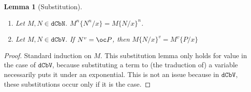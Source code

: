 \documentclass[10pt,a4paper]{article}
\newtheorem{lemma}[theorem]{Lemma}
\newcommand{\<}{\langle}
\renewcommand{\>}{\rangle}
\newcommand{\dcbn}{\ensuremath{\mathtt{dCbN}}}
\newcommand{\dcbv}{\ensuremath{\mathtt{dCbV}}}
\newcommand{\tradv}[1]{\ensuremath{{#1}^v}}
\newcommand{\tradn}[1]{\ensuremath{{#1}^n}}
\begin{document}
\begin{lemma}[Substitution]\label{lem:trad_subst}~
	\begin{enumerate}
		\item Let $M,N\in\dcbn$. $\tradn M\{\tradn
			N/x\}=\tradn{M\{N/x\}}$.
		\item Let $M,N\in\dcbv$. If $\tradv N=\oc P$, then
			$\tradv{M\{N/x\}}=\tradv M\{P/x\}$
	\end{enumerate}
\end{lemma}
\begin{proof}
	Standard induction on $M$. This substitution lemma only holds for value in the
	case of $\dcbv$, because substituting a term to (the traduction of) a variable
	necessarily puts it under an exponential. This is not an issue because in \dcbv, these
	substitutions occur only if it is the case.
\end{proof}
\end{document}
